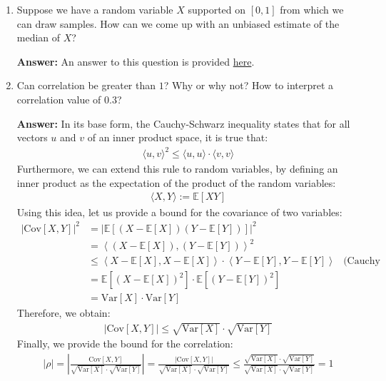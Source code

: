 \documentclass{article}
\newenvironment{QandA}{\begin{enumerate}[label=\arabic*.]}{\end{enumerate}}
\newenvironment{answer}{\par\normalfont \textbf{Answer:}}{}
\newcommand{\Exp}[1]{\mathbb{E}\left[ #1 \right]}
\newcommand{\Vari}[1]{\text{Var}\left[ #1 \right]}
\newcommand{\Cov}[1]{\text{Cov}\left[ #1 \right]}
\begin{document}
\begin{QandA}
    \item Suppose we have a random variable $X$  supported on  $[0,1]$ from which we can draw samples. How can we come up with an unbiased estimate of the median of $X$?
    \begin{answer}
        An answer to this question is provided \href{https://stats.stackexchange.com/questions/36134/an-unbiased-estimate-of-the-median}{here}.
    \end{answer}

    \item Can correlation be greater than $1$? Why or why not? How to interpret a correlation value of $0.3$?
    \begin{answer}
        In its base form, the Cauchy-Schwarz inequality states that for all vectors $u$ and $v$ of an inner product space, it is true that:
        \begin{align*}
            \langle u, v\rangle^2 \le \langle u, u \rangle \cdot \langle v, v \rangle
        \end{align*}
        Furthermore, we can extend this rule to random variables, by defining an inner product as the expectation of the product of the random variables:
        \begin{align*}
            \langle X, Y \rangle := \Exp{XY}
        \end{align*}
        Using this idea, let us provide a bound for the covariance of two variables:
        \begin{align*}
            \left\vert \Cov{X, Y} \right\vert^2 &= \left \vert \Exp{(X - \Exp{X}) (Y - \Exp{Y})} \right \vert^2 \\
            &= \left \langle (X - \Exp{X}), (Y - \Exp{Y}) \right \rangle^2 \\
            &\le  \left \langle X - \Exp{X}, X - \Exp{X} \right \rangle \cdot \left \langle Y - \Exp{Y}, Y - \Exp{Y} \right \rangle &\text{(Cauchy Schwarz)}\\
            &= \Exp{(X - \Exp{X})^2} \cdot \Exp{(Y - \Exp{Y})^2} \\
            &= \Vari{X} \cdot \Vari{Y}
        \end{align*}
        Therefore, we obtain:
        \begin{align*}
            \left\vert \Cov{X, Y} \right\vert \le \sqrt{\Vari{X}} \cdot \sqrt{\Vari{Y}}
        \end{align*}
        Finally, we provide the bound for the correlation:
        \begin{align*}
            \vert \rho \vert = \left \vert \frac{\Cov{X, Y}}{\sqrt{\Vari{X}} \cdot \sqrt{\Vari{Y}}} \right \vert =  \frac{\left \vert \Cov{X, Y}\right \vert}{\sqrt{\Vari{X}} \cdot \sqrt{\Vari{Y}}} \le \frac{\sqrt{\Vari{X}} \cdot \sqrt{\Vari{Y}}}{\sqrt{\Vari{X}} \cdot \sqrt{\Vari{Y}}} = 1

\end{align*}
\end{answer}
\end{QandA}
\end{document}
